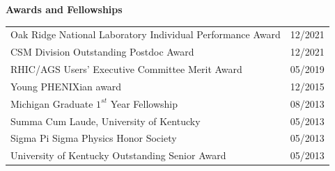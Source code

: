 \documentclass[11pt]{article}
\begin{document}
\newpage




\vspace{7pt}
\begin{flushleft}
	\LARGE\textbf{Awards and Fellowships} \\
	\normalsize
	
	\begin{tabular}{ll}
		Oak Ridge National Laboratory Individual Performance Award & \hspace*{3.5cm}12/2021 \\
		CSM Division Outstanding Postdoc Award & \hspace*{3.5cm}12/2021 \\
		RHIC/AGS Users' Executive Committee Merit Award & \hspace*{3.5cm}05/2019\\
		Young PHENIXian award & \hspace*{3.5cm}12/2015\\
		Michigan Graduate $1^{st}$ Year Fellowship & \hspace*{3.5cm}08/2013 \\
		Summa Cum Laude, University of Kentucky & \hspace*{3.5cm}05/2013 \\
		Sigma Pi Sigma Physics Honor Society & \hspace*{3.5cm}05/2013 \\
		University of Kentucky Outstanding Senior Award & \hspace*{3.5cm}05/2013\\
	\end{tabular}
\end{flushleft}







\end{document}

